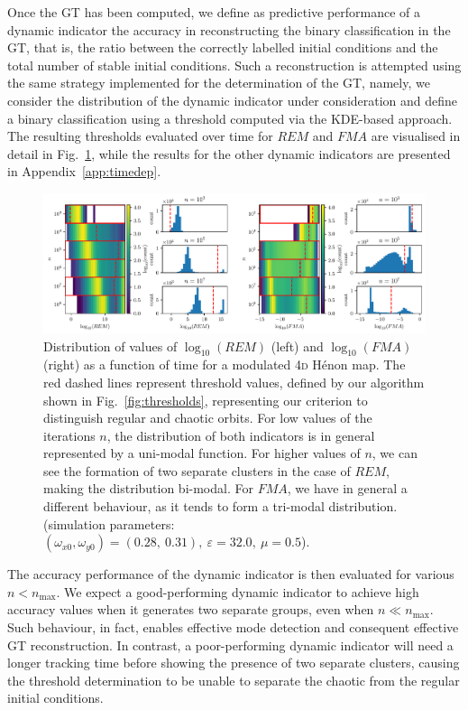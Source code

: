 Once the GT has been computed, we define as predictive performance of a dynamic indicator the accuracy in reconstructing the binary classification in the GT, that is, the ratio between the correctly labelled initial conditions and the total number of stable initial conditions. Such a reconstruction is attempted using the same strategy implemented for the determination of the GT, namely, we consider the distribution of the dynamic indicator under consideration and define a binary classification using a threshold computed via the KDE-based approach. The resulting thresholds evaluated over time for $REM$ and $FMA$ are visualised in detail in Fig.~\ref{fig:neo_evolution}, while the results for the other dynamic indicators are presented in Appendix~\ref{app:timedep}.

\begin{figure}[htp]
    \centering
    \includegraphics[width=1.0\textwidth]{6_dynamic_indicators/fig/corrected_figs/neo_evolution_idx_3.pdf}
    \caption{Distribution of values of $\log_{10}(REM)$ (left) and $\log_{10}(FMA)$ (right) as a function of time for a modulated 4\textsc{d} Hénon map. The red dashed lines represent threshold values, defined by our algorithm shown in Fig.~\ref{fig:thresholds}, representing our criterion to distinguish regular and chaotic orbits.
    For low values of the iterations $n$, the distribution of both indicators is in general represented by a uni-modal function. For higher values of $n$, we can see the formation of two separate clusters in the case of $REM$, making the distribution bi-modal. For $FMA$, we have in general a different behaviour, as it tends to form a tri-modal distribution. (simulation parameters: $(\omega_{x0},\omega_{y0})= (0.28,\ 0.31),\ \varepsilon=32.0,\ \mu=0.5$).}
    \label{fig:neo_evolution}
\end{figure}

The accuracy performance of the dynamic indicator is then evaluated for various $n < n_{\text{max}}$. We expect a good-performing dynamic indicator to achieve high accuracy values when it generates two separate groups, even when $n \ll n_{\text{max}}$. Such behaviour, in fact, enables effective mode detection and consequent effective GT reconstruction. In contrast, a poor-performing dynamic indicator will need a longer tracking time before showing the presence of two separate clusters, causing the threshold determination to be unable to separate the chaotic from the regular initial conditions.

